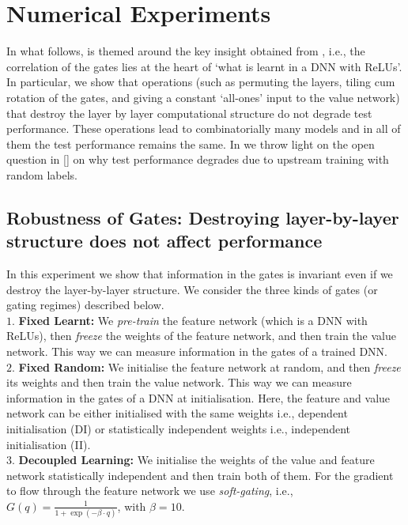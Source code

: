 \section{Numerical Experiments}\label{sec:exp} 
In what follows,  is themed around the key insight obtained from , i.e., the correlation of the gates lies at the heart of `what is learnt in a DNN with ReLUs'. In particular, we show that operations (such as permuting the layers, tiling cum rotation of the gates, and giving a constant `all-ones' input to the value network) that destroy the layer by layer computational structure do not degrade test performance. These operations lead to combinatorially many models and in all of them the test performance remains the same. In  we throw light on the open question in [] on why test performance degrades due to upstream training with random labels. 
\subsection{Robustness of Gates: Destroying layer-by-layer structure does not affect performance}\label{sec:exp1}
In this experiment we show that information in the gates is invariant even if we destroy the layer-by-layer structure. We consider the three kinds of gates (or gating regimes) described below.\\
\indent \quad$1.$ \textbf{Fixed Learnt:} We \emph{pre-train} the feature network (which is a DNN with ReLUs), then \emph{freeze} the weights of the feature network, and then train the value network. This way we can measure information in the gates of a trained DNN.\\
\indent \quad$2.$ \textbf{Fixed Random:} We initialise the feature network at random, and then \emph{freeze} its weights and then train the value network. This way we can measure information in the gates of a DNN at initialisation. Here, the feature and value network can be either initialised with the same weights i.e., dependent initialisation (DI) or statistically independent weights  i.e., independent initialisation (II).\\
\indent \quad$3.$ \textbf{Decoupled Learning:} We initialise the weights of the value and feature network statistically independent and then train both of them. For the gradient to flow through the feature network we use \emph{soft-gating}, i.e., $G(q)=\frac{1}{1+\exp({-\beta\cdot q})}$, with $\beta=10$. 

